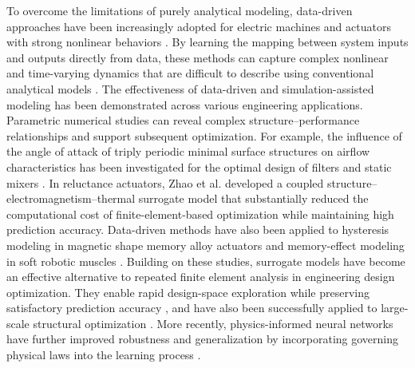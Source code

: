 \par To overcome the limitations of purely analytical modeling, data-driven approaches have been increasingly adopted for electric machines and actuators with strong nonlinear behaviors \cite{vagati2012design}. By learning the mapping between system inputs and outputs directly from data, these methods can capture complex nonlinear and time-varying dynamics that are difficult to describe using conventional analytical models \cite{cheng2024review,raissi2019physics}.
The effectiveness of data-driven and simulation-assisted modeling has been demonstrated across various engineering applications. Parametric numerical studies can reveal complex structure--performance relationships and support subsequent optimization. For example, the influence of the angle of attack of triply periodic minimal surface structures on airflow characteristics has been investigated for the optimal design of filters and static mixers \cite{mduma2026influence}. In reluctance actuators, Zhao et al. \cite{zhao2025coupled} developed a coupled structure--electromagnetism--thermal surrogate model that substantially reduced the computational cost of finite-element-based optimization while maintaining high prediction accuracy. Data-driven methods have also been applied to hysteresis modeling in magnetic shape memory alloy actuators \cite{zhang2025hysteresis} and memory-effect modeling in soft robotic muscles \cite{kim2026nonlinear}.
Building on these studies, surrogate models have become an effective alternative to repeated finite element analysis in engineering design optimization. They enable rapid design-space exploration while preserving satisfactory prediction accuracy \cite{liu2025review}, and have also been successfully applied to large-scale structural optimization \cite{hasirci2026machine}. More recently, physics-informed neural networks have further improved robustness and generalization by incorporating governing physical laws into the learning process \cite{wang2025neural}.

